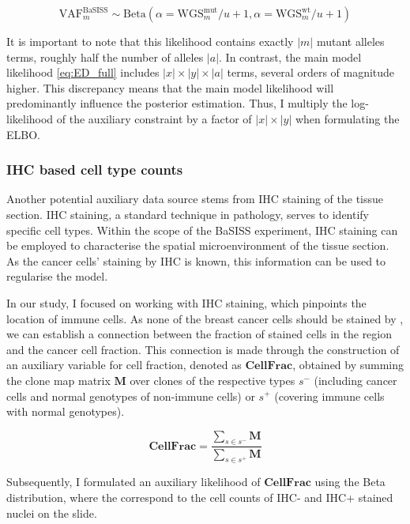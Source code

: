 \begin{equation} 
    \text{VAF}^{\text{BaSISS}}_m \sim \mathrm{Beta}(\alpha=\text{WGS}^\text{mut}_m / u + 1, \alpha=\text{WGS}^\text{wt}_m / u + 1)
\end{equation}

It is important to note that this likelihood contains exactly $|m|$ mutant alleles terms, roughly half the number of alleles $|a|$. In contrast, the main model likelihood \cref{eq:ED_full} includes $|x| \times |y| \times |a|$ terms, several orders of magnitude higher. This discrepancy means that the main model likelihood will predominantly influence the posterior estimation. Thus, I multiply the log-likelihood of the auxiliary constraint by a factor of $|x| \times |y|$ when formulating the \ac{ELBO}.

\subsubsection*{\acl{IHC} based cell type counts}

Another potential auxiliary data source stems from \ac{IHC} staining of the tissue section. \ac{IHC} staining, a standard technique in pathology, serves to identify specific cell types. Within the scope of the \ac{BaSISS} experiment, \ac{IHC} staining can be employed to characterise the spatial microenvironment of the tissue section. As the cancer cells' staining by \ac{IHC} is known, this information can be used to regularise the model.

In our study, I focused on working with  \ac{IHC} staining, which pinpoints the location of immune cells. As none of the breast cancer cells should be stained by , we can establish a connection between the fraction of stained cells in the region and the cancer cell fraction. This connection is made through the construction of an auxiliary variable for cell fraction, denoted as $\mathbf{CellFrac}$, obtained by summing the clone map matrix $\mathbf{M}$ over clones of the respective types $s^-$ (including cancer cells and normal genotypes of non-immune cells) or $s^+$ (covering immune cells with normal genotypes).

\begin{equation} 
\mathbf{CellFrac} = \dfrac{\sum_{s \in s^-} \mathbf{M}}{\sum_{s \in s^+} \mathbf{M}}
\end{equation}

Subsequently, I formulated an auxiliary likelihood of $\mathbf{CellFrac}$ using the Beta distribution, where the  correspond to the cell counts of \ac{IHC}- and \ac{IHC}+ stained nuclei on the slide.

